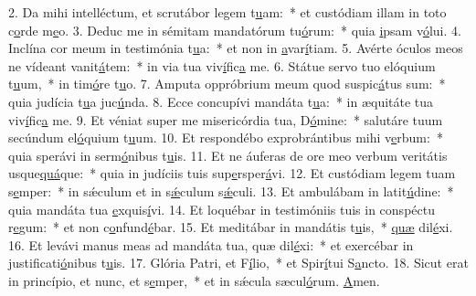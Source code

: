 2. Da mihi intelléctum, et scrutábor legem t\uline{u}am:~* et custódiam illam in toto c\uline{o}rde m\uline{e}o.
3. Deduc me in sémitam mandatórum tu\uline{ó}rum:~* quia \uline{i}psam v\uline{ó}lui.
4. Inclína cor meum in testimónia t\uline{u}a:~* et non in \uline{a}var\uline{í}tiam.
5. Avérte óculos meos ne vídeant vanit\uline{á}tem:~* in via tua viv\uline{í}fic\uline{a} me.
6. Státue servo tuo elóquium t\uline{u}um,~* in tim\uline{ó}re t\uline{u}o.
7. Amputa oppróbrium meum quod suspic\uline{á}tus sum:~* quia judícia t\uline{u}a juc\uline{ú}nda.
8. Ecce concupívi mandáta t\uline{u}a:~* in æquitáte tua viv\uline{í}fic\uline{a} me.
9. Et véniat super me misericórdia tua, D\uline{ó}mine:~* salutáre tuum secúndum el\uline{ó}quium t\uline{u}um.
10. Et respondébo exprobrántibus mihi v\uline{e}rbum:~* quia sperávi in serm\uline{ó}nibus t\uline{u}is.
11. Et ne áuferas de ore meo verbum veritátis usque\uline{quá}que:~* quia in judíciis tuis sup\uline{e}rsper\uline{á}vi.
12. Et custódiam legem tuam s\uline{e}mper:~* in sǽculum et in s\uline{ǽ}culum s\uline{ǽ}culi.
13. Et ambulábam in latit\uline{ú}dine:~* quia mandáta tua \uline{e}xquis\uline{í}vi.
14. Et loquébar in testimóniis tuis in conspéctu r\uline{e}gum:~* et non c\uline{o}nfund\uline{é}bar.
15. Et meditábar in mandátis t\uline{u}is,~* \uline{quæ} dil\uline{é}xi.
16. Et levávi manus meas ad mandáta tua, quæ dil\uline{é}xi:~* et exercébar in justificati\uline{ó}nibus t\uline{u}is.
17. Glória Patri, et F\uline{í}lio,~* et Spir\uline{í}tui S\uline{a}ncto.
18. Sicut erat in princípio, et nunc, et s\uline{e}mper,~* et in sǽcula sæcul\uline{ó}rum. \uline{A}men.
